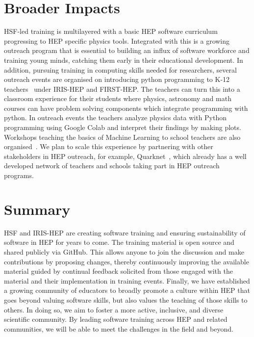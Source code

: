 \documentclass[twocolumn]{svjour3}          %
\begin{document}
\section{Broader Impacts}\label{sec:BroaderImpacts}

HSF-led training is multilayered with a basic HEP software curriculum progressing to HEP specific physics tools. Integrated with this is a growing outreach program that is essential to building an influx of software workforce and training young minds, catching them early in their educational development. In addition, pursuing training in computing skills needed for researchers, several outreach events are organised on introducing python programming to K-12 teachers~\cite{HSF-training-DA-STEM-PR-2020} under IRIS-HEP and FIRST-HEP. The teachers can turn this into a classroom experience for their students where physics, astronomy and math courses can have problem solving components which integrate programming with python. In outreach events the teachers analyze physics data with Python programming using Google Colab and interpret their findings by making plots. Workshops teaching the basics of Machine Learning to school teachers are also organised~\cite{HSF-training-ML-STEM-PR-2021}. We plan to scale this experience by partnering with other stakeholders in HEP outreach, for example, Quarknet~\cite{quarknet}, which already has a well developed network of teachers and schools taking part in HEP outreach programs.

\section{Summary}\label{sec:Summary}

HSF and IRIS-HEP are creating software training and ensuring sustainability of software in HEP for years to come. The training material is open source and shared publicly via GitHub. This allows anyone to join the discussion and make contributions by proposing changes, thereby continuously improving the available material guided by continual feedback solicited from those engaged with the material and their implementation in training events. Finally, we have established a growing community of educators to broadly promote a culture within HEP that goes beyond valuing software skills, but also values the teaching of those skills to others. In doing so, we aim to foster a more active, inclusive, and diverse scientific community.  By leading software training across HEP and related communities, we will be able to meet the challenges in the field and beyond.
\end{document}
